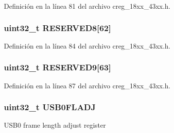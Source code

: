 Definición en la línea 81 del archivo creg\+\_\+18xx\+\_\+43xx.\+h.

\subsubsection[{\texorpdfstring{R\+E\+S\+E\+R\+V\+E\+D8}{RESERVED8}}]{ uint32\+\_\+t R\+E\+S\+E\+R\+V\+E\+D8\mbox{[}62\mbox{]}}\hypertarget{struct_l_p_c___c_r_e_g___t_af823fc7fc0277f531c28aa30666fbcbf}{}\label{struct_l_p_c___c_r_e_g___t_af823fc7fc0277f531c28aa30666fbcbf}


Definición en la línea 84 del archivo creg\+\_\+18xx\+\_\+43xx.\+h.

\subsubsection[{\texorpdfstring{R\+E\+S\+E\+R\+V\+E\+D9}{RESERVED9}}]{ uint32\+\_\+t R\+E\+S\+E\+R\+V\+E\+D9\mbox{[}63\mbox{]}}\hypertarget{struct_l_p_c___c_r_e_g___t_a2e20c23829d0f6e51b5011d0dcb379ee}{}\label{struct_l_p_c___c_r_e_g___t_a2e20c23829d0f6e51b5011d0dcb379ee}


Definición en la línea 87 del archivo creg\+\_\+18xx\+\_\+43xx.\+h.

\subsubsection[{\texorpdfstring{U\+S\+B0\+F\+L\+A\+DJ}{USB0FLADJ}}]{ uint32\+\_\+t U\+S\+B0\+F\+L\+A\+DJ}\hypertarget{struct_l_p_c___c_r_e_g___t_ada432ad352c696c4206692c9c83fb2bc}{}\label{struct_l_p_c___c_r_e_g___t_ada432ad352c696c4206692c9c83fb2bc}
U\+S\+B0 frame length adjust register 

